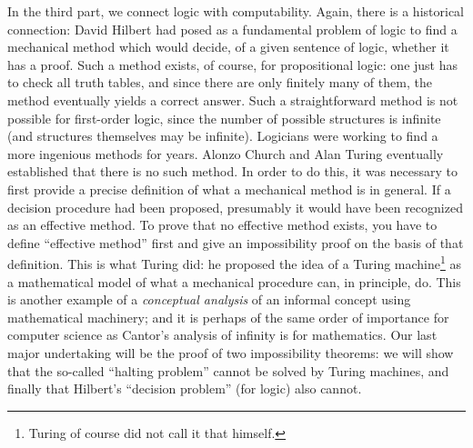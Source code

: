 In the third part, we connect logic with computability. Again, there
is a historical connection: David Hilbert had posed as a fundamental
problem of logic to find a mechanical method which would decide, of a
given sentence of logic, whether it has a proof. Such a method exists,
of course, for propositional logic: one just has to check all truth
tables, and since there are only finitely many of them, the method
eventually yields a correct answer. Such a straightforward method is
not possible for first-order logic, since the number of possible
structures is infinite (and structures themselves may be
infinite). Logicians were working to find a more ingenious methods for
years. Alonzo Church and Alan Turing eventually established that
there is no such method. In order to do this, it was necessary to
first provide a precise definition of what a mechanical method is in
general. If a decision procedure had been proposed, presumably it
would have been recognized as an effective method. To prove that no
effective method exists, you have to define ``effective method'' first
and give an impossibility proof on the basis of that definition. This
is what Turing did: he proposed the idea of a Turing
machine\footnote{Turing of course did not call it that himself.} as a
mathematical model of what a mechanical procedure can, in principle,
do. This is another example of a \emph{conceptual analysis} of an
informal concept using mathematical machinery; and it is perhaps of
the same order of importance for computer science as Cantor's analysis
of infinity is for mathematics. Our last major undertaking will be
the proof of two impossibility theorems: we will show that the
so-called ``halting problem'' cannot be solved by Turing machines, and
finally that Hilbert's ``decision problem'' (for logic) also cannot.


